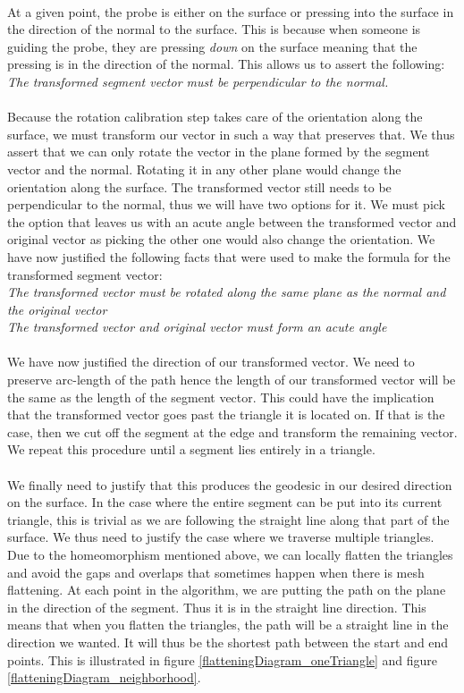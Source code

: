 \documentclass[conference]{acmsiggraph}
\begin{document}
\\
At a given point, the probe is either on the surface or pressing into the surface in the direction of the normal to the surface. This is because when someone is guiding the probe, they are pressing {\it down} on the surface meaning that the pressing is in the direction of the normal. This allows us to assert the following: {\it The transformed segment vector must be perpendicular to the normal. }\\
\\
Because the rotation calibration step takes care of the orientation along the surface, we must transform our vector in such a way that preserves that. We thus assert that we can only rotate the vector in the plane formed by the segment vector and the normal. Rotating it in any other plane would change the orientation along the surface. The transformed vector still needs to be perpendicular to the normal, thus we will have two options for it. We must pick the option that leaves us with an acute angle between the transformed vector and original vector as picking the other one would also change the orientation. We have now justified the following facts that were used to make the formula for the transformed segment vector: \\
{\it The transformed vector must be rotated along the same plane as the normal and the original vector}\\
{\it The transformed vector and original vector must form an acute angle}
\\
\\
We have now justified the direction of our transformed vector. We need to preserve arc-length of the path hence the length of our transformed vector will be the same as the length of the segment vector. This could have the implication that the transformed vector goes past the triangle it is located on. If that is the case, then we cut off the segment at the edge and transform the remaining vector. We repeat this procedure until a segment lies entirely in a triangle. \\
\\
We finally need to justify that this produces the geodesic in our desired direction on the surface. In the case where the entire segment can be put into its current triangle, this is trivial as we are following the straight line along that part of the surface. We thus need to justify the case where we traverse multiple triangles. Due to the homeomorphism mentioned above, we can locally flatten the triangles and avoid the gaps and overlaps that sometimes happen when there is mesh flattening. At each point in the algorithm, we are putting the path on the plane in the direction of the segment. Thus it is in the straight line direction. This means that when you flatten the triangles, the path will be a straight line in the direction we wanted. It will thus be the shortest path between the start and end points. This is illustrated in figure \ref{flatteningDiagram_oneTriangle} and figure \ref{flatteningDiagram_neighborhood}. 
\end{document}
